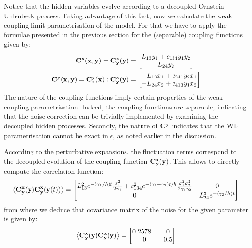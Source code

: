 \documentclass[12pt]{article}
\begin{document}
Notice that the hidden variables evolve according to a decoupled Ornstein-Uhlenbeck process. Taking advantage of this fact, now we calculate the weak coupling limit parametrisation of the model. For that we have to apply the formulae presented in the previous section for the (separable) coupling functions given by:
\begin{align}
\mathbf{C} ^{\mathbf{x}}(\mathbf{x} , \mathbf{y})=\mathbf{C} _{\mathbf{y}}^{\mathbf{x}}(\mathbf{y}) &= \begin{bmatrix}
L_{13}y_1 + c_{134}y_1y_2 \\ 
L_{24}y_2 
\end{bmatrix} \\ 
\mathbf{C} ^{\mathbf{y}}(\mathbf{x} , \mathbf{y})=\mathbf{C} ^{\mathbf{y}}_{\mathbf{x}}(\mathbf{x} ):\mathbf{C} _{\mathbf{y}}^{\mathbf{x}}(\mathbf{y}) &= \begin{bmatrix}
-L_{13}x_1 + c_{341}y_2x_1 \\ 
-L_{24}x_2 + c_{413}y_1x_2
\end{bmatrix}	
\end{align}
The nature of the coupling functions imply certain properties of the weak-coupling parametrisation. Indeed, the coupling functions are separable, indicating that the noise correction can be trivially implemented by examining the decoupled hidden processes. Secondly, the nature of $\mathbf{C} ^{\mathbf{y}}$ indicates that the WL parametrisation cannot be exact in $\epsilon$, as noted earlier in the discussion.

According to the perturbative expansions, the fluctuation terms correspond to the decoupled evolution of the coupling function $\mathbf{C} ^{\mathbf{x}}_{\mathbf{y}}(\mathbf{y})$. This allows to directly compute the correlation function:
\begin{align}\label{autocorrelation function wl}
	\left \langle  \mathbf{C} ^{\mathbf{x}}_{\mathbf{y}}(\mathbf{y})\mathbf{C} ^{\mathbf{x}}_{\mathbf{y}}(\mathbf{y} (t)) \right\rangle = \begin{bmatrix} L_{13}^2e^{-(\gamma_1/h)t}\frac{\sigma_1^2}{2\gamma_1} + c_{134}^2e^{-(\gamma_1+\gamma_2)t/h}\frac{\sigma_1^2\sigma_2^2}{2\gamma _1 \gamma_2}& 0 \\ 0 & L_{24}^2e^{-(\gamma_2/h)t}\end{bmatrix}
\end{align}
from where we deduce that covariance matrix of the noise for the given parameter is given by:
\begin{equation}\label{covariance matrix wl}
	\left \langle  \mathbf{C} ^{\mathbf{x}}_{\mathbf{y}}(\mathbf{y})\mathbf{C} ^{\mathbf{x}}_{\mathbf{y}}(\mathbf{y}) \right\rangle = \begin{bmatrix}
	0.2578... & 0 \\ 0 & 0.5 
	\end{bmatrix}
\end{equation}
\end{document}
